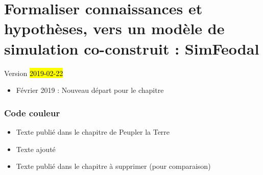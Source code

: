 \chapter{Formaliser connaissances et hypothèses, vers un modèle de simulation co-construit : SimFeodal}
\label{chap:chap2}
\begin{center}
	{\large Version \hl{2019-02-22}}
\end{center}

\begin{itemize}
	\item Février 2019 : Nouveau départ pour le chapitre
\end{itemize}

\minitoc

\clearpage

\subsection*{Code couleur}
\begin{itemize}
	\item Texte publié dans le chapitre de Peupler la Terre
	\item {\blueroman Texte ajouté}
	\item {\redroman Texte publié dans le chapitre à supprimer (pour comparaison)}
\end{itemize}


